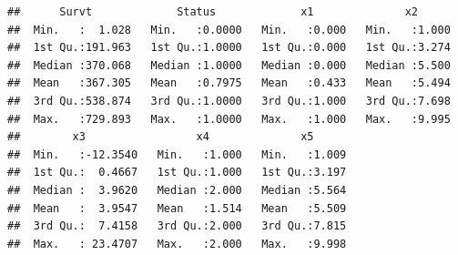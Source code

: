 \documentclass[
]{article}
\begin{document}
\begin{verbatim}
##      Survt             Status             x1              x2       
##  Min.   :  1.028   Min.   :0.0000   Min.   :0.000   Min.   :1.000  
##  1st Qu.:191.963   1st Qu.:1.0000   1st Qu.:0.000   1st Qu.:3.274  
##  Median :370.068   Median :1.0000   Median :0.000   Median :5.500  
##  Mean   :367.305   Mean   :0.7975   Mean   :0.433   Mean   :5.494  
##  3rd Qu.:538.874   3rd Qu.:1.0000   3rd Qu.:1.000   3rd Qu.:7.698  
##  Max.   :729.893   Max.   :1.0000   Max.   :1.000   Max.   :9.995  
##        x3                 x4              x5       
##  Min.   :-12.3540   Min.   :1.000   Min.   :1.009  
##  1st Qu.:  0.4667   1st Qu.:1.000   1st Qu.:3.197  
##  Median :  3.9620   Median :2.000   Median :5.564  
##  Mean   :  3.9547   Mean   :1.514   Mean   :5.509  
##  3rd Qu.:  7.4158   3rd Qu.:2.000   3rd Qu.:7.815  
##  Max.   : 23.4707   Max.   :2.000   Max.   :9.998
\end{verbatim}
\end{document}
